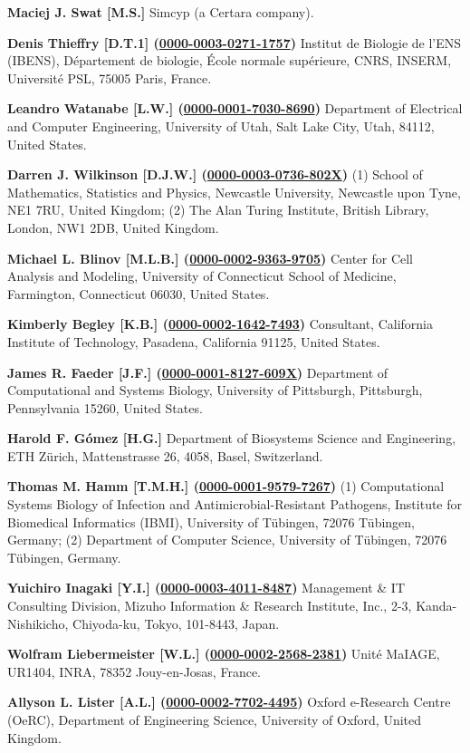 \documentclass{sbml-paper}
\newcommand{\orcid}[1]{\href{https://orcid.org/#1}{#1}}
\begin{document}
\textbf{Maciej J. Swat [M.S.]} Simcyp (a Certara company).

\textbf{Denis Thieffry [D.T.1] (\orcid{0000-0003-0271-1757})} Institut de Biologie de l'ENS (IBENS), Département de biologie, École normale supérieure, CNRS, INSERM, Université PSL, 75005 Paris, France.

\textbf{Leandro Watanabe [L.W.] (\orcid{0000-0001-7030-8690})} Department of Electrical and Computer Engineering,  University of Utah, Salt Lake City, Utah, 84112, United States.

\textbf{Darren J. Wilkinson [D.J.W.] (\orcid{0000-0003-0736-802X})} (1) School of Mathematics, Statistics and Physics, Newcastle University, Newcastle upon Tyne, NE1 7RU, United Kingdom; (2) The Alan Turing Institute, British Library, London, NW1 2DB, United Kingdom.

\textbf{Michael L. Blinov [M.L.B.] (\orcid{0000-0002-9363-9705})} Center for Cell Analysis and Modeling, University of Connecticut School of Medicine, Farmington, Connecticut 06030, United States.

\textbf{Kimberly Begley [K.B.] (\orcid{0000-0002-1642-7493})} Consultant, California Institute of Technology, Pasadena, California 91125, United States.

\textbf{James R. Faeder [J.F.] (\orcid{0000-0001-8127-609X})} Department of Computational and Systems Biology, University of Pittsburgh, Pittsburgh, Pennsylvania 15260, United States.

\textbf{Harold F. Gómez [H.G.]} Department of Biosystems Science and Engineering, ETH Zürich, Mattenstrasse 26, 4058, Basel, Switzerland.

\textbf{Thomas M. Hamm [T.M.H.] (\orcid{0000-0001-9579-7267})} (1) Computational Systems Biology of Infection and Antimicrobial-Resistant Pathogens, Institute for Biomedical Informatics (IBMI), University of Tübingen, 72076 Tübingen, Germany; (2) Department of Computer Science, University of Tübingen, 72076 Tübingen, Germany.

\textbf{Yuichiro Inagaki [Y.I.] (\orcid{0000-0003-4011-8487})} Management \& IT Consulting Division, Mizuho Information \& Research Institute, Inc., 2-3, Kanda-Nishikicho, Chiyoda-ku, Tokyo, 101-8443, Japan.

\textbf{Wolfram Liebermeister [W.L.] (\orcid{0000-0002-2568-2381})} Unité MaIAGE, UR1404, INRA, 78352 Jouy-en-Josas, France.

\textbf{Allyson L. Lister [A.L.] (\orcid{0000-0002-7702-4495})} Oxford e-Research Centre (OeRC), Department of Engineering Science, University of Oxford, United Kingdom.
\end{document}
